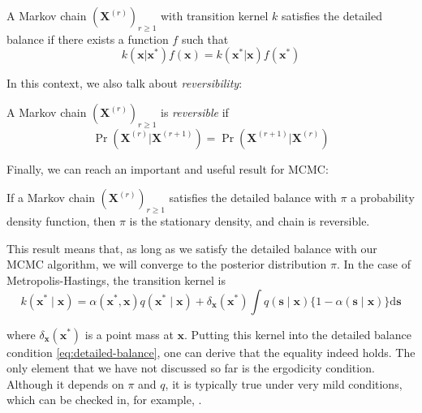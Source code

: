 \documentclass[12pt]{memoir}
\newcommand{\mb}{\mathbf}
\newcommand{\ti}{\textit}
\begin{document}
\begin{boxedthm}
    A Markov chain $(\mb X^{(r)})_{r\geq1}$ with transition kernel $k$ satisfies the detailed balance if there exists a function $f$ such that
    \begin{equation}\label{eq:detailed-balance}
        k(\mb x|\mb x^*) f(\mb x) = k(\mb x^*|\mb x) f(\mb x^*)
    \end{equation}
\end{boxedthm}

In this context, we also talk about \ti{reversibility}:


\begin{boxedthm}
    A Markov chain $(\mb X^{(r)})_{r\geq1}$ is \ti{reversible} if
\begin{equation}
    \Pr(\mb X^{(r)} | \mb X^{(r+1)}) = \Pr(\mb X^{(r+1)} | \mb X^{(r)})
\end{equation}
\end{boxedthm}

Finally, we can reach an important and useful result for MCMC:


\begin{boxedthm}
    If a Markov chain $(\mb X^{(r)})_{r\geq1}$ satisfies the detailed balance with $\pi$ a probability density function, then $\pi$ is the stationary density, and chain is reversible.
\end{boxedthm}


This result means that, as long as we satisfy the detailed balance with our MCMC algorithm, we will converge to the posterior distribution $\pi$. In the case of Metropolis-Hastings, the transition kernel is
\begin{equation}\label{eq:mh-transition-kernel}
    k\left(\boldsymbol{x}^* \mid \boldsymbol{x}\right)=\alpha\left(\boldsymbol{x}^*, \boldsymbol{x}\right) q\left(\boldsymbol{x}^* \mid \boldsymbol{x}\right)+\delta_{\boldsymbol{x}}\left(\boldsymbol{x}^*\right) \int q(\boldsymbol{s} \mid \boldsymbol{x})\{1-\alpha(\boldsymbol{s} \mid \boldsymbol{x})\} \mathrm{d} \boldsymbol{s}
\end{equation}

where $\delta_{\mb x}(\mb x^*)$ is a point mass at $\mb x$. Putting this kernel into the detailed balance condition \ref{eq:detailed-balance}, one can derive that the equality indeed holds. The only element that we have not discussed so far is the ergodicity condition. Although it depends on $\pi$ and $q$, it is typically true under very mild conditions, which can be checked in, for example, \cite{mcmc:RobertCasella2004}.\medbreak
\end{document}
